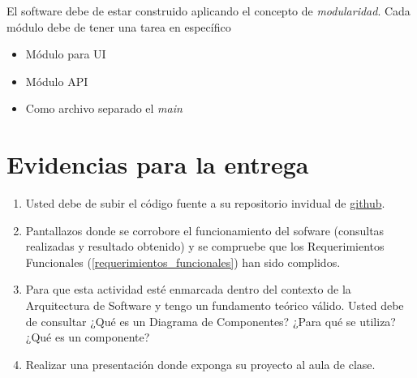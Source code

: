 \documentclass[12pt]{article}
\begin{document}
El software debe de estar construido aplicando el concepto de \textit{modularidad}. Cada módulo debe de tener una tarea en específico 


\begin{itemize}
\item Módulo para UI
\item Módulo API
\item Como archivo separado el \textit{main}
\end{itemize}


\section{Evidencias para la entrega}

\begin{enumerate}
    \item Usted debe de subir el código fuente a su repositorio invidual de  \href{https://github.com/}{github}. 
    
    \item Pantallazos donde se corrobore el funcionamiento del sofware (consultas realizadas y resultado obtenido) y se compruebe que los Requerimientos Funcionales (\autoref{requerimientos_funcionales}) han sido complidos.
    
    \item Para que esta actividad esté enmarcada dentro del contexto de la Arquitectura de Software y tengo un fundamento teórico válido. Usted debe de consultar ¿Qué es un Diagrama de Componentes? ¿Para qué se utiliza? ¿Qué es un componente?

    \item Realizar una presentación donde exponga su proyecto al aula de clase.
\end{enumerate}
\end{document}
